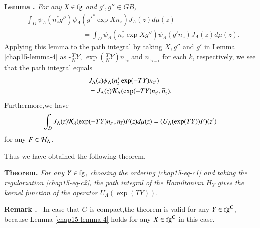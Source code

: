 \medskip
\noindent
{\bfseries Lemma . \label{chap15-lemma-4}} \textit{For any $X \in \operatorname{fg}$ and $g', g'' \in GB$,}
\begin{equation*}
\begin{split}
&\int_{D}\psi_{\Lambda}(n_{z}^{*}g'')\psi_{\Lambda}(g'^{*} \exp Xn_{z})J_{\Lambda}(z)d\mu(z)\\
&\qquad \qquad \qquad \qquad =\int_{D}\psi_{\Lambda}(n_{z}^{*} \exp Xg'')\psi_{\Lambda}(g'n_{z})J_{\Lambda}(z)d \mu(z).
\end{split}
\end{equation*}
Applying this lemma to the path integral by taking $X, g''$ and $g'$ in Lemma \ref{chap15-lemma-4} as -$\frac{T}{N}Y$, $\exp \left(\frac{T}{N}Y\right)n_{z_{k}}$ and $n_{z_{k-1}}$ for each $k$, respectively, we see that the path integral equals
\begin{align*}
&J_{\Lambda}(z)\psi_{\Lambda}(n_{z}^{*}\exp(-TY)n_{z'})\\
&=J_{\Lambda}(z)\mathcal{K}_{\Lambda}(\exp(-TY)n_{z'}, \overline{n}_{z}).
\end{align*}
Furthermore,\pageoriginale we have
\begin{equation*}
\int_{D}J_{\Lambda}(z)\mathcal{K}_{\lambda}(\exp(-TY)n_{z'}, n_{\overline{z}})F(z)d\mu(z)= (U_{\Lambda}(\exp(TY))F)(z')
\end{equation*}
for any $F \in \mathcal{H}_{\Lambda}$.

Thus we have obtained the following theorem.

\medskip
\noindent
{\bfseries Theorem.} \textit{For any $Y \in \operatorname{fg}$, choosing the ordering \eqref{chap15-eq-c1} and taking the regularzation \eqref{chap15-eq-c2}, the path integral of the Hamiltonian $H_{Y}$ gives the kernel function of the operator $U_{\Lambda}(\exp(TY))$}.

\medskip
\noindent
{\bfseries Remark . \label{chap15-remark-2}}~In case that $G$ is compact,the theorem is valid for any $Y \in \operatorname{fg}^{\mathbf{C}}$, because Lemma \ref{chap15-lemma-4} holds for any $X\in \operatorname{fg}^{\mathbf{C}}$  in this case.

